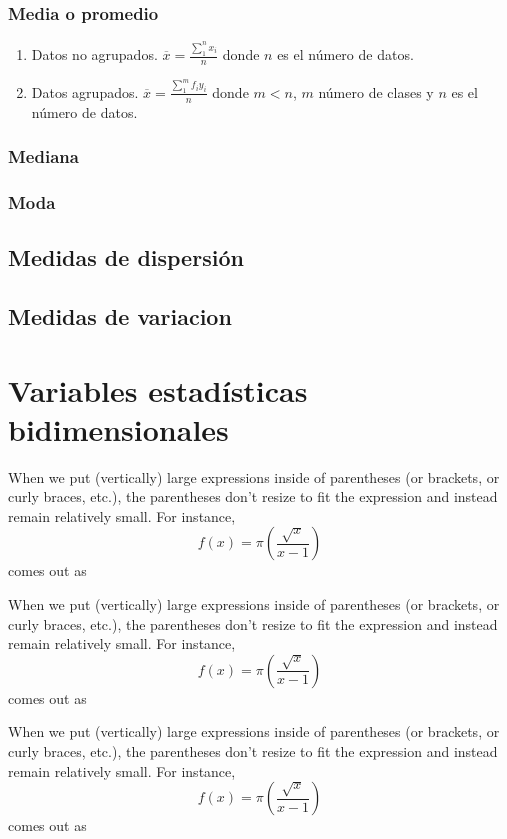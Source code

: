 \documentclass[a4paper]{report}
\begin{document}
\subsection{Media o promedio}
\begin{enumerate}
	\item Datos no agrupados. $\overline{x}=\frac{\sum_1^nx_i}{n}$ donde $n$ es el número de datos.
	\item Datos agrupados.  $\overline{x}=\frac{\sum_1^mf_iy_i}{n}$ donde $m<n$, $m$ número de clases y $n$ es el número de datos.
\end{enumerate}

\subsection{Mediana}


\subsection{Moda}


\section{Medidas de dispersión}
\section{Medidas de variacion}



\chapter{Variables estadísticas bidimensionales}

When we put (vertically) large expressions inside of parentheses (or brackets, or curly braces, etc.), the parentheses don't resize to fit the expression and instead remain relatively small. For instance, $$f(x) = \pi(\frac{\sqrt{x}}{x-1})$$ comes out as

When we put (vertically) large expressions inside of parentheses (or brackets, or curly braces, etc.), the parentheses don't resize to fit the expression and instead remain relatively small. For instance, $$f(x) = \pi(\frac{\sqrt{x}}{x-1})$$ comes out as

When we put (vertically) large expressions inside of parentheses (or brackets, or curly braces, etc.), the parentheses don't resize to fit the expression and instead remain relatively small. For instance, $$f(x) = \pi(\frac{\sqrt{x}}{x-1})$$ comes out as
\end{document}
